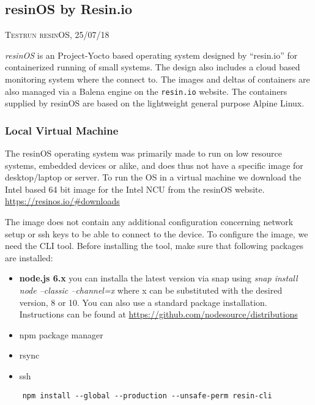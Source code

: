 \documentclass[]{scrartcl}
\begin{document}
\subsection{resinOS by Resin.io}

{\small\textsc{Testrun resinOS, 25/07/18} \bigskip}

\textit{resinOS} is an Project-Yocto based operating system designed by ``resin.io'' for containerized running of small systems. The design also includes a cloud based monitoring system where the connect to. The images and deltas of containers are also managed via a Balena engine on the \texttt{resin.io} website. The containers supplied by resinOS are based on the lightweight general purpose Alpine Linux.

\subsubsection{Local Virtual Machine}

The resinOS operating system was primarily made to run on low resource systems, embedded devices or alike, and does thus not have a specific image for desktop/laptop or server. To run the OS in a virtual machine we download the Intel based 64 bit image for the Intel NCU from the resinOS website. \url{https://resinos.io/#downloads}

The image does not contain any additional configuration concerning network setup or ssh keys to be able to connect to the device. To configure the image, we need the CLI tool. Before installing the tool, make sure that following packages are installed:

\begin{itemize}
	
	\item \textbf{node.js 6.x} you can installa the latest version via snap using \textit{snap install node --classic --channel=x} where x can be substituted with the desired version, 8 or 10. You can also use a standard package installation. Instructions can be found at \url{https://github.com/nodesource/distributions}
	\item npm package manager
	\item rsync
	\item ssh
	
\end{itemize}

\begin{verbatim}
	npm install --global --production --unsafe-perm resin-cli
\end{verbatim}
\end{document}
